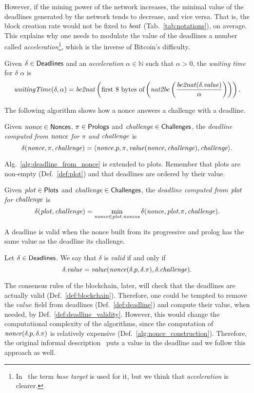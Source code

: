 However, if the mining power of the network increases, the minimal value of the deadlines
generated by the network
tends to decrease, and vice versa. That is, the block creation rate would not be
fixed to ${\mathit{beat}}$ (Tab.~\ref{tab:notations}), on average.
This explains why one needs to modulate the value of the deadlines \wrt a number
called \emph{acceleration}\footnote{In~\cite{SignumPlotting} the term
\emph{base target} is used for it, but we think that \emph{acceleration} is clearer.},
which is the inverse of Bitcoin's difficulty.
%
\begin{definition}\label{def:deadline}
  Given $\delta\in{\mathsf{Deadlines}}$ and an \emph{acceleration}
  $\alpha\in\mathbb{N}$ such that $\alpha>0$, the
  \emph{waiting time} for $\delta$ \wrt $\alpha$ is
  \[
  {\mathit{waitingTime}}(\delta,\alpha)
  ={\mathit{be2nat}}\left(\text{first $8$ bytes of}\left({\mathit{nat2be}}\left(\frac{{\mathit{be2nat}}(\delta.\mathit{value})}{\alpha}\right)\right)\right).
  \]
\end{definition}
%
The following algorithm shows how a nonce answers a challenge with a deadline.
%
\begin{alg}[$\delta(\nonce,\pi,\challenge)$]\label{alg:deadline_from_nonce}
  Given ${\mathit{nonce}}\in{\mathsf{Nonces}}$, $\pi\in{\mathsf{Prologs}}$ and ${\mathit{challenge}}\in{\mathsf{Challenges}}$, the
  \emph{deadline computed from ${\mathit{nonce}}$ for $\pi$ and ${\mathit{challenge}}$} is
  \[
  \delta({\mathit{nonce}},\pi,{\mathit{challenge}})=\langle{\mathit{nonce}}.p,\pi,\mathit{value}({\mathit{nonce}},{\mathit{challenge}}),{\mathit{challenge}}\rangle.
  \]
\end{alg}
%
Alg.~\ref{alg:deadline_from_nonce} is extended to plots. Remember that plots are non-empty
(Def.~\ref{def:plot}) and that deadlines are ordered by their value.
%
\begin{alg}[$\deadline(\plot,\challenge)$]\label{alg:deadline_from_plot}
  Given ${\mathit{plot}}\in{\mathsf{Plots}}$ and ${\mathit{challenge}}\in{\mathsf{Challenges}}$, the \emph{deadline computed
  from ${\mathit{plot}}$ for ${\mathit{challenge}}$} is
  \[
  \delta({\mathit{plot}},{\mathit{challenge}})=\min\limits_{{\mathit{nonce}}\in{\mathit{plot}}.{\mathit{nonces}}}\delta({\mathit{nonce}},{\mathit{plot}}.\pi,{\mathit{challenge}}).
  \]
\end{alg}
%
A deadline is valid when the nonce built from its progressive and prolog
has the same value as the deadline \wrt its challenge.
%
\begin{definition}\label{def:deadline_validity}
  Let $\delta\in{\mathsf{Deadlines}}$. We say that $\delta$ is \emph{valid} if and only if
  \[
  \delta.\mathit{value}=\mathit{value}({\mathit{nonce}}(\delta.p,\delta.\pi),\delta.{\mathit{challenge}}).
  \]
\end{definition}
%
The consensus rules of the blockchain, later, will check that the deadlines are
actually valid (Def.~\ref{def:blockchain}). Therefore, one could be tempted to
remove the $\mathit{value}$ field from deadlines (Def.~\ref{def:deadline}) and compute
their value, when needed, by Def.~\ref{def:deadline_validity}. However, this would change the
computational complexity of the algorithms, since the computation of
${\mathit{nonce}}(\delta.p,\delta.\pi)$ is relatively expensive (Def.~\ref{alg:nonce_construction}).
Therefore, the original informal description~\cite{SignumPlotting} puts a value in the deadline
and we follow this approach as well.
